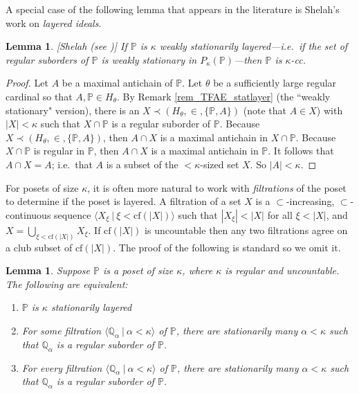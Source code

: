 \documentclass{amsart}
\newtheorem{lemma}[theorem]{Lemma}
\begin{document}
A special case of the following lemma that appears in the literature is Shelah's work on \emph{layered ideals}.  
\begin{lemma}\label{lem_StatLayerImpliesKappaCC}[Shelah (see \cite{MattHandbook})]
If $\mathbb{P}$ is $\kappa$ weakly stationarily layered---i.e.\ if the set of regular suborders of $\mathbb{P}$ is weakly stationary in $P_\kappa(\mathbb{P})$---then $\mathbb{P}$ is $\kappa$-cc.
\end{lemma}
\begin{proof}
Let $A$ be a maximal antichain of $\mathbb{P}$.  Let $\theta$ be a sufficiently large regular cardinal so that $A, \mathbb{P} \in H_\theta$.  By Remark \ref{rem_TFAE_statlayer} (the ``weakly stationary" version), there is an $X \prec (H_\theta , \in, \{ \mathbb{P}, A \})$ (note that $A \in X$) with $|X|<\kappa$ such that $X \cap \mathbb{P}$ is a regular suborder of $\mathbb{P}$.  Because $X \prec (H_\theta , \in, \{ \mathbb{P}, A \})$, then $A \cap X$ is a maximal antichain in $X \cap \mathbb{P}$.  Because $X \cap \mathbb{P}$ is regular in $\mathbb{P}$, then $A \cap X$ is a maximal antichain in $\mathbb{P}$.  It follows that $A \cap X = A$; i.e.\ that $A$ is a subset of the $<\kappa$-sized set $X$.  So $|A| < \kappa$.
\end{proof}

For posets of size $\kappa$, it is often more natural to work with \emph{filtrations} of the poset to determine if the poset is layered.  A filtration of a set $X$ is a $\subset$-increasing, $\subset$-continuous sequence $\langle X_\xi \ | \ \xi < \text{cf}(|X|) \rangle$ such that $|X_\xi| < |X|$ for all $\xi < |X|$, and $X = \bigcup_{\xi < \text{cf}(|X|)} X_\xi$.  If $\text{cf}(|X|)$ is uncountable then any two filtrations agree on a club subset of $\text{cf}(|X|)$.  The proof of the following is standard so we omit it.
\begin{lemma}\label{lem_FiltrationLayering}
Suppose $\mathbb{P}$ is a poset of size $\kappa$, where $\kappa$ is regular and uncountable.  The following are equivalent:
\begin{enumerate}
 \item $\mathbb{P}$ is $\kappa$ stationarily layered
 \item For some filtration $\langle \mathbb{Q}_\alpha \ |  \ \alpha < \kappa \rangle$ of $\mathbb{P}$, there are stationarily many $\alpha < \kappa$ such that $\mathbb{Q}_\alpha$ is a regular suborder of $\mathbb{P}$.
 \item For every filtration $\langle \mathbb{Q}_\alpha \ |  \ \alpha < \kappa \rangle$ of $\mathbb{P}$, there are stationarily many $\alpha < \kappa$ such that $\mathbb{Q}_\alpha$ is a regular suborder of $\mathbb{P}$.
\end{enumerate} 
\end{lemma}
\end{document}
